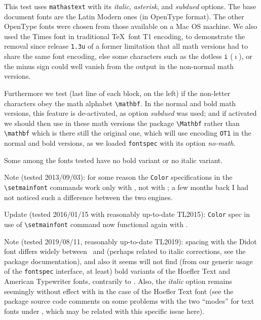 \documentclass{article}
\begin{document}
\testfileincipit

This test uses \verb|mathastext| with its \emph{italic}, \emph{asterisk}, and
\emph{subdued} options. The base document fonts are the Latin Modern ones (in
OpenType format). The other OpenType fonts were chosen from those available on
a Mac OS machine. We also used the Times font in traditional \TeX\ font T1
encoding, to demonstrate the removal since release \texttt{1.3u} of a former
limitation that all math versions had to share the same font encoding, else
some characters such as the dotless \texttt{i} ($\imath$), or the minus sign
could well vanish from the output in the non-normal math versions.

Furthermore we test (last line of each block, on the left) if the non-letter
characters obey the math alphabet \verb|\mathbf|. In the normal and bold math
versions, this feature is de-activated, as option \emph{subdued} was used; and
if activated we should then use in these math versions the package
\verb|\Mathbf| rather than \verb|\mathbf| which is there still the original
one, which will use encoding \verb|OT1| in the normal and bold versions, as we
loaded \verb|fontspec| with its option \emph{no-math}.

Some among the fonts tested have no bold variant or no italic variant.

Note (tested 2013/09/03): for some reason the \verb|Color| specifications in the
\verb|\setmainfont| commands work only
with \XeLaTeX{}, not with \LuaLaTeX{}; a few months back I had not noticed
such a difference between the two engines.

Update (tested 2016/01/15 with reasonably up-to-date TL2015): \verb|Color|
spec in use of \verb|\setmainfont| command now functional again with
\LuaLaTeX.

Note (tested 2019/08/11, reasonably up-to-date TL2019): spacing with the Didot
font differs widely between \XeLaTeX\ and \LuaLaTeX{} (perhaps related to
italic corrections, see the package documentation), and also it seems
\LuaLaTeX{} will not find (from our generic usage of the \verb|fontspec|
interface, at least) bold variants of the Hoefler Text and American Typewriter
fonts, contrarily to \XeLaTeX. Also, the \emph{italic} option remains
seemingly without effect with \LuaLaTeX{} in the case of the Hoefler Text font
(see the package source code comments on some problems with the two ``modes''
for text fonts under \LuaLaTeX, which may be related with this specific issue
here).
\end{document}
